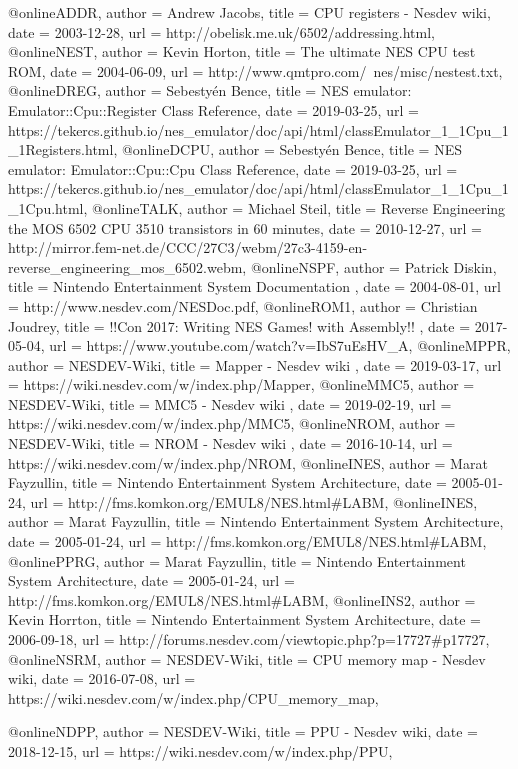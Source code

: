 @online{ADDR,
	author = {Andrew Jacobs},
	title = {CPU registers - Nesdev wiki},
	date = {2003-12-28},
	url = {http://obelisk.me.uk/6502/addressing.html},
}
@online{NEST,
	author = {Kevin Horton},
	title = {The ultimate NES CPU test ROM},
	date = {2004-06-09},
	url = {http://www.qmtpro.com/~nes/misc/nestest.txt},
}
@online{DREG,
	author = {Sebestyén Bence},
	title = {NES emulator: Emulator::Cpu::Register Class Reference},
	date = {2019-03-25},
	url = {https://tekercs.github.io/nes_emulator/doc/api/html/classEmulator_1_1Cpu_1_1Registers.html},
}
@online{DCPU,
	author = {Sebestyén Bence},
	title = {NES emulator: Emulator::Cpu::Cpu Class Reference},
	date = {2019-03-25},
	url = {https://tekercs.github.io/nes_emulator/doc/api/html/classEmulator_1_1Cpu_1_1Cpu.html},
}
@online{TALK,
	author = {Michael Steil},
	title = {Reverse Engineering the MOS 6502 CPU 3510 transistors in 60 minutes},
	date = {2010-12-27},
	url = {http://mirror.fem-net.de/CCC/27C3/webm/27c3-4159-en-reverse_engineering_mos_6502.webm},
}
@online{NSPF,
	author = {Patrick Diskin},
	title = {Nintendo Entertainment System Documentation },
	date = {2004-08-01},
	url = {http://www.nesdev.com/NESDoc.pdf},
}
@online{ROM1,
	author = {Christian Joudrey},
	title = {!!Con 2017: Writing NES Games! with Assembly!! },
	date = {2017-05-04},
	url = {https://www.youtube.com/watch?v=IbS7uEsHV_A},
}
@online{MPPR,
	author = {NESDEV-Wiki},
	title = {Mapper - Nesdev wiki },
	date = {2019-03-17},
	url = {https://wiki.nesdev.com/w/index.php/Mapper},
}
@online{MMC5,
	author = {NESDEV-Wiki},
	title = {MMC5 - Nesdev wiki },
	date = {2019-02-19},
	url = {https://wiki.nesdev.com/w/index.php/MMC5},
}
@online{NROM,
	author = {NESDEV-Wiki},
	title = {NROM - Nesdev wiki },
	date = {2016-10-14},
	url = {https://wiki.nesdev.com/w/index.php/NROM},
}
@online{INES,
	author = {Marat Fayzullin},
	title = {Nintendo Entertainment System Architecture},
	date = {2005-01-24},
	url = {http://fms.komkon.org/EMUL8/NES.html#LABM},
}
@online{INES,
	author = {Marat Fayzullin},
	title = {Nintendo Entertainment System Architecture},
	date = {2005-01-24},
	url = {http://fms.komkon.org/EMUL8/NES.html#LABM},
}
@online{PPRG,
	author = {Marat Fayzullin},
	title = {Nintendo Entertainment System Architecture},
	date = {2005-01-24},
	url = {http://fms.komkon.org/EMUL8/NES.html#LABM},
}
@online{INS2,
	author = {Kevin Horrton},
	title = {Nintendo Entertainment System Architecture},
	date = {2006-09-18},
	url = {http://forums.nesdev.com/viewtopic.php?p=17727#p17727},
}
@online{NSRM,
	author = {NESDEV-Wiki},
	title = {CPU memory map - Nesdev wiki},
	date = {2016-07-08},
	url = {https://wiki.nesdev.com/w/index.php/CPU_memory_map},
}

@online{NDPP,
	author = {NESDEV-Wiki},
	title = {PPU - Nesdev wiki},
	date = {2018-12-15},
	url = {https://wiki.nesdev.com/w/index.php/PPU},
}

